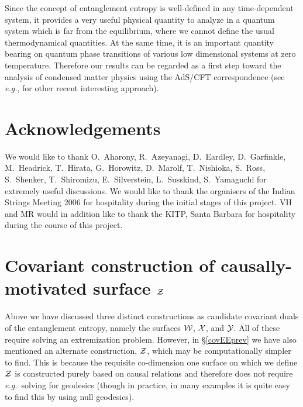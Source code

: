 \documentclass[12pt]{article}
\def\sec#1{\S \;\ref{#1}}
\def\eg{{\it e.g.}}
\def\CW{{\cal W}}
\def\CX{{\cal X}}
\def\CY{{\cal Y}}
\def\CZ{{\cal Z}}
\def\Gms{\CW}
\def\Lms{\CY}
\def\Xms{\CX}
\def\Cms{\CZ}
\begin{document}
Since the concept of entanglement entropy is well-defined in any
time-dependent system, it provides a very useful physical quantity
to analyze in a quantum system which is far from the equilibrium,
where we cannot define the usual thermodynamical quantities. At the
same time, it is an important quantity bearing on quantum phase
transitions of various low dimensional systems at zero temperature.
Therefore our results can be regarded as a first step toward the
analysis of condensed matter physics using the AdS/CFT
correspondence (see \eg, \cite{Herzog:2007ij} for other recent
interesting approach).





\section*{Acknowledgements}
We would like to thank O.~Aharony, R.~Azeyanagi, D.~Eardley, D.~Garfinkle, M.~Headrick, T.~Hirata, G.~Horowitz, D.~Marolf, T.~Nishioka, S.~Ross,  S.~Shenker, T.~Shiromizu, E.~Silverstein, L.~Susskind, S.~Yamaguchi for extremely useful discussions. We would like to thank the organisers of the Indian Strings Meeting 2006 for hospitality during the initial stages of this project. VH and MR would in addition  like to thank the KITP, Santa Barbara for hospitality during the course of this project.

\appendix
\section{Covariant construction of causally-motivated surface $\Cms$}
\label{3dspl}

Above we have discussed three distinct constructions as candidate covariant duals of the entanglement entropy, namely the surfaces $\Gms$, $\Xms$, and $\Lms$.   All of these require solving an extremization problem.  However, in \sec{covEEprev} we have also mentioned an alternate construction, $\Cms$, which may be computationally simpler to find.  This is because the requisite co-dimension one surface on which we define $\Cms$ is constructed purely based on causal relations and therefore does not require \eg\ solving for geodesics (though in practice, in many examples it is quite easy to find this by using null geodesics).
\end{document}
